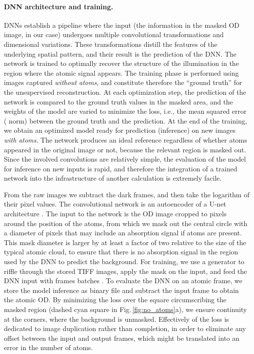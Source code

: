 \documentclass[twocolumn,groupedaddress,longbibliography]{revtex4-1}
\begin{document}
\paragraph*{DNN architecture and training.}
DNNs establish a pipeline where the input (the information in the masked OD image, in our case) undergoes multiple convolutional transformations and dimensional variations. These transformations distill the features of the underlying spatial pattern, and their result is the prediction of the DNN. The network is trained to optimally recover the structure of the illumination in the region where the atomic signal appears. The training phase is performed using images captured \emph{without atoms}, and constitute therefore the ``ground truth'' for the unsupervised reconstruction. At each optimization step, the prediction of the network is compared to the ground truth values in the masked area, and the weights of the model are varied to minimize the loss, i.e., the mean squared error ( norm) between the ground truth and the prediction.
At the end of the training, we obtain an optimized model ready for prediction (inference) on new images \emph{with atoms}. The network produces an ideal reference regardless of whether atoms appeared in the original image or not, because the relevant region is masked out. Since the involved convolutions are relatively simple, the evaluation of the model for inference on new inputs is rapid, and therefore the integration of a trained network into the infrastructure of another calculation is extremely facile.

From the raw images we subtract the dark frames, and then take the logarithm of their pixel values. The convolutional network is an autoencoder of a U-net architecture \cite{Ronneberger2015}. The input to the network is the OD image cropped to  pixels around the position of the atoms, from which we mask out the central circle with a diameter of  pixels \cite{calibration} that may include an absorption signal if atoms are present. This mask diameter is larger by at least a factor of two relative to the size of the typical atomic cloud, to ensure that there is no absorption signal in the region used by the DNN to predict the background.
For training, we use a generator to riffle through the stored TIFF images, apply the mask on the input, and feed the DNN input with  frames batches \cite{chollet2015keras}. To evaluate the DNN on an atomic frame, we store the model inference as binary file and subtract the input frame to obtain the atomic OD.
By minimizing the loss over the square circumscribing the masked region (dashed cyan square in Fig.\,\ref{fig:no_atoms}a), we ensure continuity at the corners, where the background is unmasked. Effectively  of the loss is dedicated to image duplication rather than completion, in order to eliminate any offset between the input and output frames, which might be translated into an error in the number of atoms.
\end{document}
